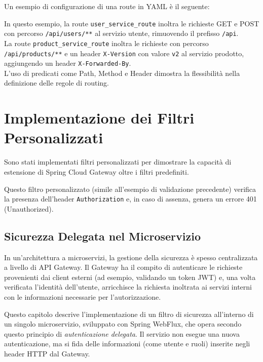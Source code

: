 Un esempio di configurazione di una route in YAML è il seguente:



In questo esempio, la route \texttt{user\_service\_route} inoltra le richieste GET e POST con percorso \texttt{/api/users/**} al servizio utente, rimuovendo il prefisso \texttt{/api}. \\
La route \texttt{product\_service\_route} inoltra le richieste con percorso \texttt{/api/products/**} e un header \texttt{X-Version} con valore \texttt{v2} al servizio prodotto, aggiungendo un header \texttt{X-Forwarded-By}. \\
L'uso di predicati come Path, Method e Header dimostra la flessibilità nella definizione delle regole di routing.

\section{Implementazione dei Filtri Personalizzati}
Sono stati implementati filtri personalizzati per dimostrare la capacità di estensione di Spring Cloud Gateway oltre i filtri predefiniti.


Questo filtro personalizzato (simile all'esempio di validazione precedente) verifica la presenza dell'header \texttt{Authorization} e, in caso di assenza, genera un errore 401 (Unauthorized).

\subsection{Sicurezza Delegata nel Microservizio}

In un'architettura a microservizi, la gestione della sicurezza è spesso centralizzata a livello di API Gateway. 
Il Gateway ha il compito di autenticare le richieste provenienti dai client esterni (ad esempio, validando un token JWT) e, una volta verificata l'identità dell'utente, arricchisce la richiesta inoltrata ai servizi interni con le informazioni necessarie per l'autorizzazione.

Questo capitolo descrive l'implementazione di un filtro di sicurezza all'interno di un singolo microservizio, sviluppato con Spring WebFlux, che opera secondo questo principio di \textit{autenticazione delegata}.
Il servizio non esegue una nuova autenticazione, ma si fida delle informazioni (come utente e ruoli) inserite negli header HTTP dal Gateway.

